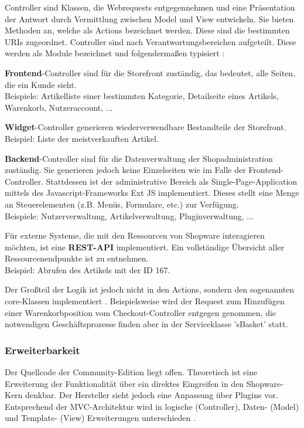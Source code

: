 \documentclass[11pt, a4paper, titlepage, listof=totoc, bibliography=totoc, index=totoc, twoside, openright, headings=normal]{scrreprt}
\begin{document}
Controller sind Klassen, die Webrequests entgegennehmen und eine Präsentation der Antwort durch Vermittlung zwischen Model und View entwickeln. Sie bieten Methoden an, welche als Actions bezeichnet werden. Diese sind die bestimmten URIs zugeordnet. Controller sind nach Verantwortungsbereichen aufgeteilt. Diese werden als Module bezeichnet und folgendermaßen typisiert \citep{shopware4Docs}:
\begin{compactitem}
\item \textbf{Frontend}-Controller sind für die Storefront zuständig, das bedeutet, alle Seiten, die ein Kunde sieht.\\
Beispiele: Artikelliste einer bestimmten Kategorie, Detailseite eines Artikels, Warenkorb, Nutzeraccount, ...
\item \textbf{Widget}-Controller generieren wiederverwendbare Bestandteile der Storefront.\\
Beispiel: Liste der meistverkauften Artikel.
\item \textbf{Backend}-Controller sind für die Datenverwaltung der Shopadministration zuständig. Sie generieren jedoch keine Einzelseiten wie im Falle der Frontend-Controller. Stattdessen ist der administrative Bereich als Single-Page-Application mittels des Javascript-Frameworks Ext JS implementiert. Dieses stellt eine Menge an Steuerelementen (z.B. Menüs, Formulare, etc.) zur Verfügung.\\
Beispiele: Nutzerverwaltung, Artikelverwaltung, Pluginverwaltung, ...
\item Für externe Systeme, die mit den Ressourcen von Shopware interagieren möchten, ist eine \textbf{REST-API} implementiert. Ein vollständige Übersicht aller Ressourcenendpunkte ist \citep{shopwareRestApiEndpunkte} zu entnehmen.\\
Beispiel: Abrufen des Artikels mit der ID 167.
\end{compactitem}

Der Großteil der Logik ist jedoch nicht in den Actions, sondern den sogenannten core-Klassen implementiert \citep{shopware4Docs}. Beispielsweise wird der Request zum Hinzufügen einer Warenkorbposition vom Checkout-Controller entgegen genommen, die notwendigen Geschäftsprozesse finden aber in der Serviceklasse 'sBasket' statt.

\subsubsection{Erweiterbarkeit}
\label{subsubsection:shopwareErweiterbarkeit}
Der Quellcode der Community-Edition liegt offen. Theoretisch ist eine Erweiterung der Funktionalität über ein direktes Eingreifen in den Shopware-Kern denkbar. Der Hersteller sieht jedoch eine Anpassung über Plugins vor. Entsprechend der \ac{MVC}-Architektur wird in logische (Controller), Daten- (Model) und Template- (View) Erweiterungen unterschieden \citep{shopware5Docs}.
\end{document}
